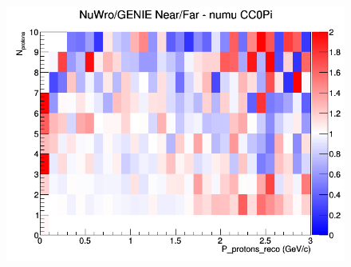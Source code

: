 \begin{figure}[h]
\endminipage
{}
\includegraphics[width=\linewidth]{eff_N_P/LAr/protons/ratios/CC0Pi_NuWro_GENIE_numu_NF_N_P.png}
\endminipage
\newline
\end{figure}
\clearpage
